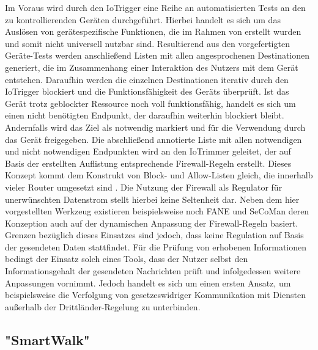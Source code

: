\noindent Im Voraus wird durch den IoTrigger eine Reihe an automatisierten Tests an den zu kontrollierenden Geräten durchgeführt. Hierbei handelt es sich um das Auslösen von gerätespezifische Funktionen, die im Rahmen von \cite[p. 13-14]{Mandalari2021} erstellt wurden und somit nicht universell nutzbar sind. 
Resultierend aus den vorgefertigten Geräte-Tests werden anschließend Listen mit allen angesprochenen Destinationen generiert, die im Zusammenhang einer Interaktion des Nutzers mit dem Gerät entstehen. Daraufhin werden die einzelnen Destinationen iterativ durch den IoTrigger blockiert und die Funktionsfähigkeit des Geräts überprüft. 
Ist das Gerät trotz geblockter Ressource noch voll funktionsfähig, handelt es sich um einen nicht benötigten Endpunkt, der daraufhin weiterhin blockiert bleibt. Andernfalls wird das Ziel als notwendig markiert und für die Verwendung durch das Gerät freigegeben. 
Die abschließend annotierte Liste mit allen notwendigen und nicht notwendigen Endpunkten wird an den IoTrimmer geleitet, der auf Basis der erstellten Auflistung entsprechende Firewall-Regeln erstellt. Dieses Konzept kommt dem Konstrukt von Block- und Allow-Listen gleich, die innerhalb vieler Router umgesetzt sind \cite{FritzBox2022}.
Die Nutzung der Firewall als Regulator für unerwünschten Datenstrom stellt hierbei keine Seltenheit dar. Neben dem hier vorgestellten Werkzeug existieren beispielsweise noch FANE \cite{Haar2019} und SeCoMan \cite{Huertas2016} deren Konzeption auch auf der dynamischen Anpassung der Firewall-Regeln basiert. Grenzen bezüglich dieses Einsatzes sind jedoch, dass keine Regulation auf Basis der gesendeten Daten stattfindet. 
Für die Prüfung von erhobenen Informationen bedingt der Einsatz solch eines Tools, dass der Nutzer selbst den Informationsgehalt der gesendeten Nachrichten prüft und infolgedessen weitere Anpassungen vornimmt. Jedoch handelt es sich um einen ersten Ansatz, um beispielsweise die Verfolgung von gesetzeswidriger Kommunikation mit Diensten außerhalb der Drittländer-Regelung \cite{dsgvo2016} zu unterbinden.

\subsection{"SmartWalk" \cite{Natix2022}}
\label{sec:Regulationsmöglichkeiten:ssec:SmartWalk}

